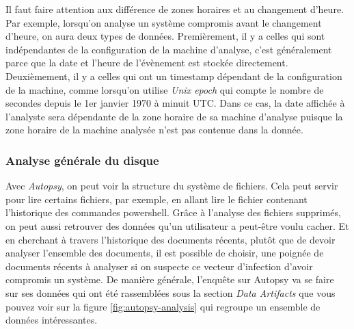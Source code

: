 Il faut faire attention aux différence de zones horaires et au changement d'heure. Par exemple, lorsqu'on analyse un système compromis avant le changement d'heure, on aura deux types de données. Premièrement, il y a celles qui sont indépendantes de la configuration de la machine d'analyse, c'est généralement parce que la date et l'heure de l'évènement est stockée directement. Deuxièmement, il y a celles qui ont un timestamp dépendant de la configuration de la machine, comme lorsqu'on utilise \textit{Unix epoch} qui compte le nombre de secondes depuis le 1er janvier 1970 à minuit UTC. Dans ce cas, la date affichée à l'analyste sera dépendante de la zone horaire de sa machine d'analyse puisque la zone horaire de la machine analysée n'est pas contenue dans la donnée.



\subsubsection{Analyse générale du disque}

Avec \textit{Autopsy}, on peut voir la structure du système de fichiers. Cela peut servir pour lire certains fichiers, par exemple, en allant lire le fichier contenant l'historique des commandes powershell. Grâce à l'analyse des fichiers supprimés, on peut aussi retrouver des données qu'un utilisateur a peut-être voulu cacher. Et en cherchant à travers l'historique des documents récents, plutôt que de devoir analyser l'ensemble des documents, il est possible de choisir, une poignée de documents récents à analyser si on suspecte ce vecteur d'infection d'avoir compromis un système. De manière générale, l'enquête sur Autopsy va se faire sur ses données qui ont été rassemblées sous la section \textit{Data Artifacts} que vous pouvez voir sur la figure \ref{fig:autopsy-analysis} qui regroupe un ensemble de données intéressantes.

